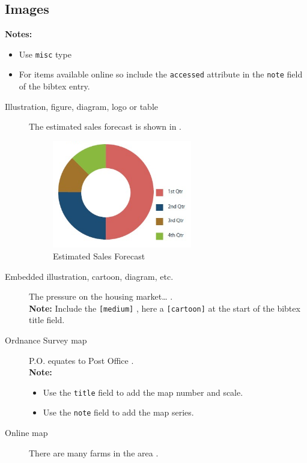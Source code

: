 \documentclass[12pt,oneside]{book} %
\begin{document}
\subsection{Images}
\label{sec:images}
\textbf{Notes:} 
\begin{itemize}
\item Use \texttt{misc} type
\item For items available online   so include the \texttt{accessed} attribute in the \texttt{note} field of the bibtex entry.
\end{itemize}
\begin{description}
\item[Illustration, figure, diagram, logo or table] The estimated sales forecast is shown in .
\begin{figure}[ht]
\begin{center}
\includegraphics[width=0.6\textwidth]{Sales}
\end{center}
\caption{Estimated Sales Forecast~\cite[p.4]{wisker_good_2012}}
\label{fig:sales}
\end{figure}
\item[Embedded illustration, cartoon, diagram, etc.] The pressure on the housing market… \cite{wood_cartoon_2014}.\\
\textbf{Note:} Include the \texttt{[medium]} , here a \texttt{[cartoon]} at the start of the bibtex title field.
\item[Ordnance Survey map] P.O. equates to Post Office \cite{ordnance_survey_oxford_1994}.\\
\textbf{Note:} 
\begin{itemize}
\item Use the \texttt{title} field to add the map number and scale.
\item Use the \texttt{note} field to add the map series.
\end{itemize}
\item[Online map] There are many farms in the area \cite{ordnance_survey_peak_2010}.\\

\end{description}
\end{document}
